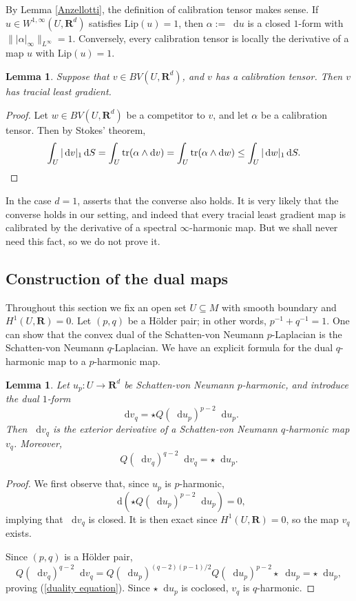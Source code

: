 \documentclass[reqno,11pt]{amsart}
\newcommand{\RR}{\mathbf{R}}
\newcommand*\dif{\mathop{}\!\mathrm{d}}
\DeclareMathOperator{\tr}{tr}
\newcommand{\Lip}{\mathrm{Lip}}
\newtheorem{lemma}[theorem]{Lemma}
\theoremstyle{definition}
\numberwithin{equation}{section}
\begin{document}
By Lemma \ref{Anzellotti}, the definition of calibration tensor makes sense.
If $u \in W^{1, \infty}(U, \RR^d)$ satisfies $\Lip(u) = 1$, then $\alpha := \dif u$ is a closed $1$-form with $\||\alpha|_{\infty}\|_{L^\infty} = 1$.
Conversely, every calibration tensor is locally the derivative of a map $u$ with $\Lip(u) = 1$.

\begin{lemma}\label{calibrated implies least gradient}
Suppose that $v \in BV(U, \RR^d)$, and $v$ has a calibration tensor. Then $v$ has tracial least gradient.
\end{lemma}
\begin{proof}
Let $w \in BV(U, \RR^d)$ be a competitor to $v$, and let $\alpha$ be a calibration tensor. Then by Stokes' theorem,
\begin{align*}
\int_U |\dif v|_{1} \dif S
&= \int_U \tr(\alpha \wedge \dif v) = \int_U \tr(\alpha \wedge \dif w)
\leq \int_U |\dif w|_{1} \dif S. \qedhere
\end{align*}
\end{proof}

In the case $d = 1$, \cite[Theorem 2.5]{Mazon14} asserts that the converse also holds.
It is very likely that the converse holds in our setting, and indeed that every tracial least gradient map is calibrated by the derivative of a spectral $\infty$-harmonic map.
But we shall never need this fact, so we do not prove it.

\subsection{Construction of the dual maps}
Throughout this section we fix an open set $U \subseteq M$ with smooth boundary and $H^1(U, \RR) = 0$.
Let $(p, q)$ be a H\"older pair; in other words, $p^{-1} + q^{-1} = 1$.
One can show that the convex dual of the Schatten-von Neumann $p$-Laplacian is the Schatten-von Neumann $q$-Laplacian.
We have an explicit formula for the dual $q$-harmonic map to a $p$-harmonic map.

\begin{lemma}\label{dual maps are harmonic}
Let $u_p: U \to \RR^d$ be Schatten-von Neumann $p$-harmonic, and introduce the dual $1$-form
$$\dif v_q = \star Q(\dif u_p)^{p - 2} \dif u_p.$$
Then $\dif v_q$ is the exterior derivative of a Schatten-von Neumann $q$-harmonic map $v_q$.
Moreover,
\begin{equation}\label{duality equation}
  Q(\dif v_q)^{q - 2} \dif v_q = \star \dif u_p.
\end{equation}
\end{lemma}
\begin{proof}
We first observe that, since $u_p$ is $p$-harmonic,
$$\dif(\star Q(\dif u_p)^{p - 2} \dif u_p) = 0,$$
implying that $\dif v_q$ is closed.
It is then exact since $H^1(U, \RR) = 0$, so the map $v_q$ exists.

Since $(p, q)$ is a H\"older pair,
$$Q(\dif v_q)^{q - 2} \dif v_q = Q(\dif u_p)^{(q - 2)(p - 1)/2} Q(\dif u_p)^{p - 2} \star \dif u_p = \star \dif u_p,$$
proving (\ref{duality equation}).
Since $\star \dif u_p$ is coclosed, $v_q$ is $q$-harmonic.
\end{proof}
\end{document}
